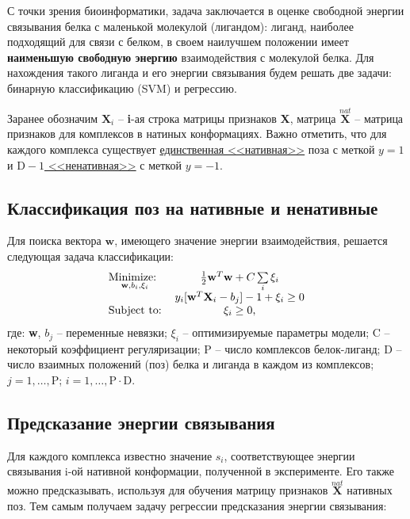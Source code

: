 \documentclass[CEJM,PDF]{Class+Reg_in_Molec_Docking} %
\begin{document}
\hspace{0.5cm}С точки зрения биоинформатики, задача заключается в оценке свободной энергии связывания белка с маленькой молекулой (лигандом): лиганд, наиболее подходящий для связи с белком, в своем наилучшем положении имеет \textbf{наименьшую свободную энергию} взаимодействия с молекулой белка. Для нахождения такого лиганда и его энергии связывания будем решать две задачи: бинарную классификацию (SVM) и регрессию. 

\hspace{0.5cm}Заранее обозначим $\mathbf{X}_i$ -- \textbf{i}-ая строка матрицы признаков \textbf{X}, матрица $\overset{nat}{\mathbf{X}}$ -- матрица признаков для комплексов в натиных конформациях. Важно отметить, что для каждого комплекса существует \underline{единственная <<нативная>>} поза с меткой $y = 1$ и \underline{$\text{D}-1$ <<ненативная>>} с меткой $y = -1$.

\subsection{Классификация поз на нативные и ненативные}

Для поиска вектора $\mathbf{w}$, имеющего значение энергии взаимодействия, решается следующая задача классификации: 
\begin{eqnarray}\label{SVM} 
\begin{tabular}{lc}
$\underset{\mathbf{w}, b_i, \xi_{i}}{\text{Minimize: }}$&$ \frac{1}{2} \mathbf{w}^T\mathbf{w} + C\sum\limits_{i}\xi_{i}$ \\ 
\multirow{3}{*}{Subject to:}
&$y_{i}[\mathbf{w}^T\mathbf{X}_{i} - b_j]-1+\xi_{i} \geq 0$\\%
&$\xi_{i} \geq 0$,
\end{tabular}
\label{eq:primal} 
\end{eqnarray}
где: \textbf{w}, $b_j$ -- переменные невязки; $\xi_{i}$ -- оптимизируемые параметры модели; C -- некоторый коэффициент регуляризации; P -- число комплексов белок-лиганд; D -- число взаимных положений (поз) белка и лиганда в каждом из комплексов; $j = 1,\hdots,\text{P}$; $i = 1,\hdots,\text{P}\cdot \text{D}$.


\subsection{Предсказание энергии связывания}

\hspace{0.5cm}Для каждого комплекса известно значение $s_i$, соответствующее энергии связывания i-ой нативной конформации, полученной в эксперименте. Его также можно предсказывать, используя для обучения матрицу признаков $\overset{nat}{\mathbf{X}}$ нативных поз. Тем самым получаем задачу регрессии предсказания энергии связывания:
\end{document}
